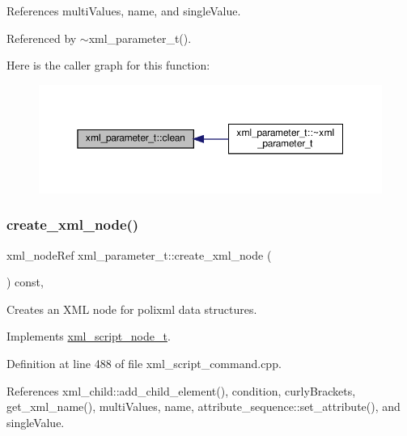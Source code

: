 References multi\+Values, name, and single\+Value.



Referenced by $\sim$xml\+\_\+parameter\+\_\+t().

Here is the caller graph for this function\+:
\nopagebreak
\begin{figure}[H]
\begin{center}
\leavevmode
\includegraphics[width=350pt]{d4/dfd/classxml__parameter__t_a9fc1880ab4a4e6e4caa97f9f858c4c2e_icgraph}
\end{center}
\end{figure}
\mbox{\label{classxml__parameter__t_aa08b7e9ca07a2cc859a40a280b31f133}} 
\subsubsection{\texorpdfstring{create\+\_\+xml\+\_\+node()}{create\_xml\_node()}}
{\footnotesize\ttfamily xml\+\_\+node\+Ref xml\+\_\+parameter\+\_\+t\+::create\+\_\+xml\+\_\+node (\begin{DoxyParamCaption}{ }\end{DoxyParamCaption}) const\hspace{0.3cm}{\ttfamily [override]}, {\ttfamily [virtual]}}



Creates an X\+ML node for polixml data structures. 



Implements \hyperlink{classxml__script__node__t_adaf9c51a079c4617f3845c6133eb477f}{xml\+\_\+script\+\_\+node\+\_\+t}.



Definition at line 488 of file xml\+\_\+script\+\_\+command.\+cpp.



References xml\+\_\+child\+::add\+\_\+child\+\_\+element(), condition, curly\+Brackets, get\+\_\+xml\+\_\+name(), multi\+Values, name, attribute\+\_\+sequence\+::set\+\_\+attribute(), and single\+Value.

